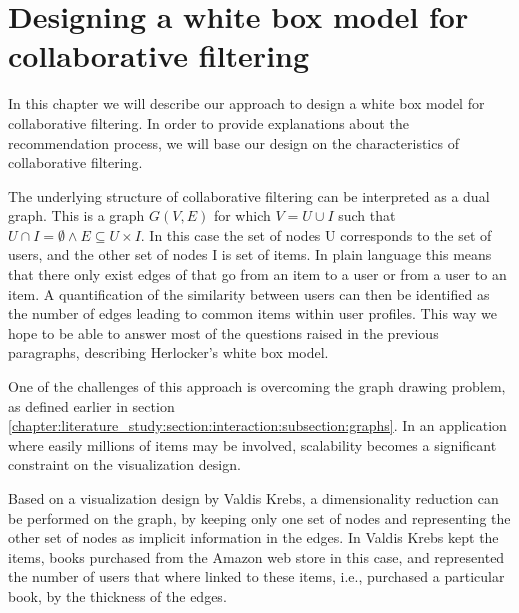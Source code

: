 \chapter{Designing a white box model for collaborative filtering}\label{chapter:whitebox}

In this chapter we will describe our approach to design a white box model for collaborative filtering. In order to provide explanations about the recommendation process, we will base our design on the characteristics of collaborative filtering.

The underlying structure of collaborative filtering can be interpreted as a dual graph. This is a graph $G(V,E)$ for which $V = U \cup I$ such that $U \cap I = \emptyset \wedge E \subseteq U \times I$\cite{dekimpe:2007}. In this case the set of nodes U corresponds to the set of users, and the other set of nodes I is set of items. In plain language this means that there only exist edges of that go from an item to a user or from a user to an item. A quantification of the similarity between users can then be identified as the number of edges leading to common items within user profiles. This way we hope to be able to answer most of the questions raised in the previous paragraphs, describing Herlocker's white box model.

One of the challenges of this approach is overcoming the graph drawing problem, as defined earlier in section \ref{chapter:literature_study:section:interaction:subsection:graphs}. In an application where easily millions of items may be involved, scalability becomes a significant constraint on the visualization design\cite{herman:2000}.


Based on a visualization design by Valdis Krebs, a dimensionality reduction can be performed on the graph, by keeping only one set of nodes and representing the other set of nodes as implicit information in the edges. In \cite{steele:2010} Valdis Krebs kept the items, books purchased from the Amazon web store in this case, and represented the number of users that where linked to these items, i.e., purchased a particular book, by the thickness of the edges.
